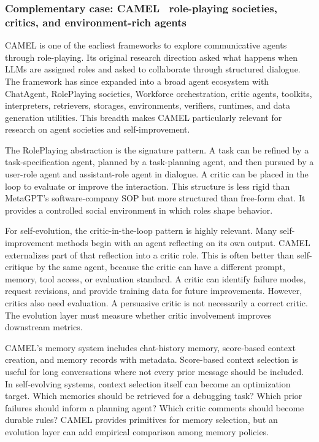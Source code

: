 \subsubsection*{Complementary case: CAMEL~\cite{camel2023} role-playing societies, critics, and environment-rich agents}

CAMEL is one of the earliest frameworks to explore communicative agents through role-playing.  Its original research direction asked what happens when LLMs are assigned roles and asked to collaborate through structured dialogue.  The framework has since expanded into a broad agent ecosystem with ChatAgent, RolePlaying societies, Workforce orchestration, critic agents, toolkits, interpreters, retrievers, storages, environments, verifiers, runtimes, and data generation utilities.  This breadth makes CAMEL particularly relevant for research on agent societies and self-improvement.

The RolePlaying abstraction is the signature pattern.  A task can be refined by a task-specification agent, planned by a task-planning agent, and then pursued by a user-role agent and assistant-role agent in dialogue.  A critic can be placed in the loop to evaluate or improve the interaction.  This structure is less rigid than MetaGPT's software-company SOP but more structured than free-form chat.  It provides a controlled social environment in which roles shape behavior.

For self-evolution, the critic-in-the-loop pattern is highly relevant.  Many self-improvement methods begin with an agent reflecting on its own output.  CAMEL externalizes part of that reflection into a critic role.  This is often better than self-critique by the same agent, because the critic can have a different prompt, memory, tool access, or evaluation standard.  A critic can identify failure modes, request revisions, and provide training data for future improvements.  However, critics also need evaluation.  A persuasive critic is not necessarily a correct critic.  The evolution layer must measure whether critic involvement improves downstream metrics.

CAMEL's memory system includes chat-history memory, score-based context creation, and memory records with metadata.  Score-based context selection is useful for long conversations where not every prior message should be included.  In self-evolving systems, context selection itself can become an optimization target.  Which memories should be retrieved for a debugging task?  Which prior failures should inform a planning agent?  Which critic comments should become durable rules?  CAMEL provides primitives for memory selection, but an evolution layer can add empirical comparison among memory policies.

